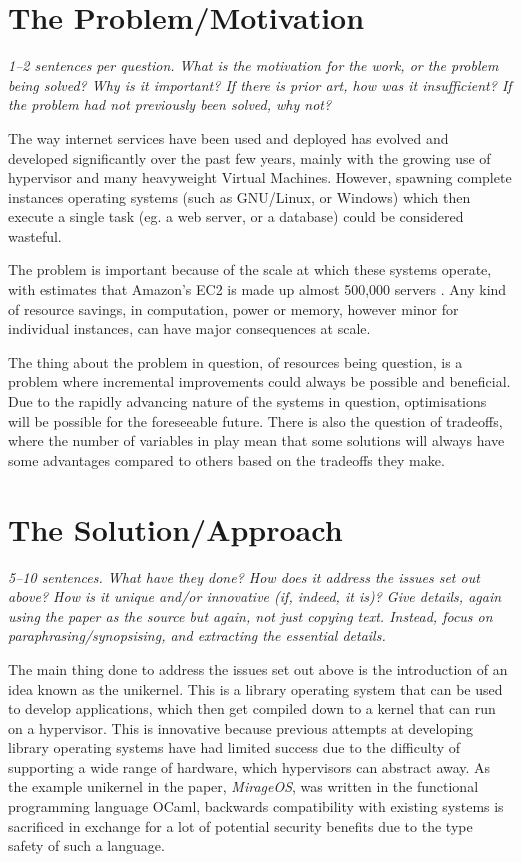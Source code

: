 \documentclass[11pt]{article}
\begin{document}
\section*{The Problem/Motivation}

\textsl{1--2 sentences per question. What is the motivation for the work, or
the problem being solved? Why is it important? If there is prior art, how was
it insufficient? If the problem had not previously been solved, why not?}

The way internet services have been used and deployed has evolved and developed
significantly over the past few years, mainly with the growing use of
hypervisor and many heavyweight Virtual Machines. However, spawning complete
instances operating systems (such as GNU/Linux, or Windows) which then execute
a single task (eg. a web server, or a database) could be considered wasteful.

The problem is important because of the scale at which these systems operate,
with estimates that Amazon's EC2 is made up almost 500,000 servers
\cite{EC2Amount}. Any kind of resource savings, in computation, power or
memory, however minor for individual instances, can have major consequences
at scale.


The thing about the problem in question, of resources being question, is a
problem where incremental improvements could always be possible and beneficial.
Due to the rapidly advancing nature of the systems in question, optimisations
will be possible for the foreseeable future. There is also the question of
tradeoffs, where the number of variables in play mean that some solutions will
always have some advantages compared to others based on the tradeoffs they
make.


\section*{The Solution/Approach}

\textsl{5--10 sentences. What have they done? How does it address the issues
set out above? How is it unique and/or innovative (if, indeed, it is)? Give
details, again using the paper as the source but again, not just copying text.
Instead, focus on paraphrasing/synopsising, and extracting the essential
details.} %

The main thing done to address the issues set out above is the introduction of
an idea known as the unikernel. This is a library operating system that can be
used to develop applications, which then get compiled down to a kernel that can
run on a hypervisor. This is innovative because previous attempts at developing
library operating systems have had limited success due to the difficulty of
supporting a wide range of hardware, which hypervisors can abstract away. As
the example unikernel in the paper, \textit{MirageOS}, was written in the
functional programming language OCaml, backwards compatibility with existing
systems is sacrificed in exchange for a lot of potential security benefits due
to the type safety of such a language.
\end{document}
